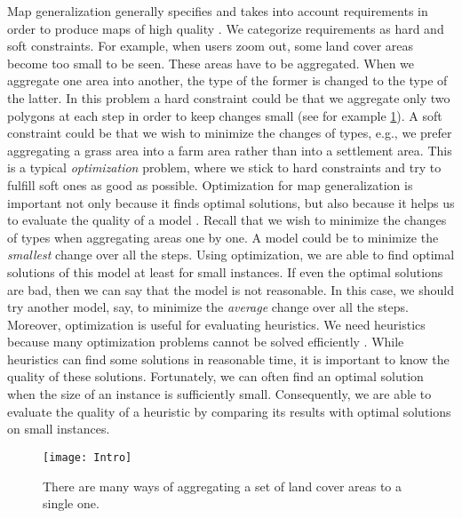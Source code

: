 Map generalization generally specifies 
and takes into account requirements
in order to produce maps of high quality
\parencite{Stoter2009Requirements}.
We categorize requirements as hard and soft constraints.
For example, when users zoom out, 
some land cover areas become too small to be seen.
These areas have to be aggregated.
When we aggregate one area into another, 
the type of the former is changed to the type of the latter. 
In this problem a hard constraint could be that 
we aggregate only two polygons at each step 
in order to keep changes small
(see for example \fig\ref{fig:Intro_SubdivisionName}). 
A soft constraint could be that 
we wish to minimize the changes of types, e.g., 
we prefer aggregating a grass area into a farm area 
rather than into a settlement area.
This is a typical \emph{optimization} problem,
where we stick to hard constraints and 
try to fulfill soft ones as good as possible.
Optimization for map generalization is important 
not only because it finds optimal solutions,
but also because it helps us to evaluate the quality of a model
\parencite{Haunert2017Label,
Haunert2008Assuring,Haunert2016Optimization}.
Recall that we wish to minimize the changes of types
when aggregating areas one by one.
A model could be to minimize 
the \emph{smallest} change over all the steps.
Using optimization, we are able to find optimal solutions
of this model at least for small instances.
If even the optimal solutions are bad,
then we can say that the model is not reasonable.
In this case, we should try another model, say, 
to minimize the \emph{average} change over all the steps.
Moreover, optimization is useful for evaluating heuristics.
We need heuristics because
many optimization problems cannot be solved efficiently
\parencite[e.g.,][]{HaunertWolff2010AreaAgg,Haunert2016Partition}.
While heuristics can find some solutions in reasonable time,
it is important to know the quality of 
these solutions.
Fortunately, we can often find an optimal solution when 
the size of an instance is sufficiently small.
Consequently, we are able to evaluate 
the quality of a heuristic 
by comparing its results with optimal solutions
on small instances.


\begin{figure}[tb]
	\centering
	\texttt{[image: Intro]}
	\caption{There are many ways of aggregating a set of land 
	cover areas to a single one.}
	\label{fig:Intro_SubdivisionName}
\end{figure}

